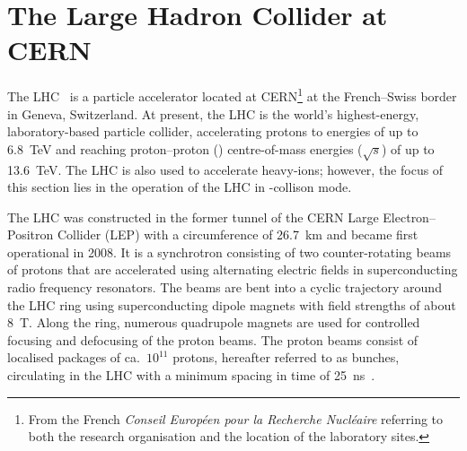 \section{The Large Hadron Collider at CERN}%
\label{sec:lhc}

The LHC~\cite{Evans:2008zzb} is a particle accelerator located at
CERN\footnote{From the French \emph{Conseil Européen pour la Recherche
    Nucléaire} referring to both the research organisation and the location of
  the laboratory sites.} at the French--Swiss border in Geneva, Switzerland.  At
present, the LHC is the world's highest-energy, laboratory-based particle
collider, accelerating protons to energies of up to \SI{6.8}{\TeV} and reaching
proton--proton (\pp) centre-of-mass energies ($\sqrt{s}$) of up to
\SI{13.6}{\TeV}. The LHC is also used to accelerate heavy-ions; however, the
focus of this section lies in the operation of the LHC in \pp-collison mode.

The LHC was constructed in the former tunnel of the CERN Large Electron--Positron
Collider (LEP) with a circumference of \SI{26.7}{\kilo\metre} and became first
operational in 2008. It is a synchrotron consisting of two counter-rotating
beams of protons that are accelerated using alternating electric fields in
superconducting radio frequency resonators. The beams are bent into a cyclic
trajectory around the LHC ring using superconducting dipole magnets with field
strengths of about \SI{8}{\tesla}. Along the ring, numerous quadrupole magnets
are used for controlled focusing and defocusing of the proton beams.
The proton beams consist of localised packages of ca.\ $10^{11}$ protons,
hereafter referred to as bunches, circulating in the LHC with a minimum spacing
in time of \SI{25}{\nano\second}~\cite{Evans:2008zzb}.

